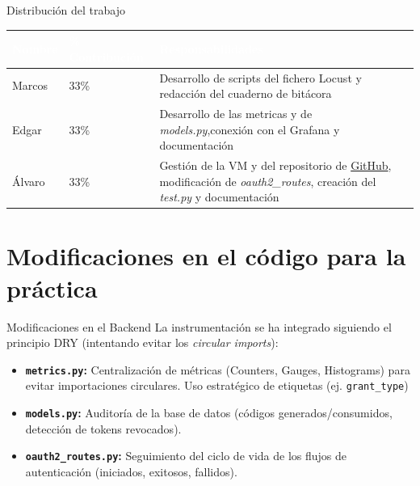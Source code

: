 \documentclass[10pt, aspectratio=169]{beamer}
\begin{document}
	\begin{frame}{Distribución del trabajo}
		\centering
		\renewcommand{\arraystretch}{1.3}
		
		\begin{tabular}{p{3.5cm} p{2.5cm} p{5cm}}
			\toprule
			
			\textcolor{white}{\textbf{Nombre}} & 
			\textcolor{white}{\textbf{\% Contribución}} & 
			\textcolor{white}{\textbf{Responsabilidades}} \\
			
			\midrule
			
			Marcos & 33\% & Desarrollo de scripts del fichero Locust y redacción del cuaderno de bitácora \\
			
			Edgar & 33\% & Desarrollo de las metricas y de \textit{models.py},conexión con el Grafana y documentación \\
			
			Álvaro & 33\% & Gestión de la VM y del repositorio de \hyperlink{https://github.com/ALVPI/ESI/tree/code}{GitHub}, modificación de \textit{oauth2\_routes}, creación del \textit{test.py} y  documentación \\
			
			\bottomrule
		\end{tabular}
		
	\end{frame}
	\section{Modificaciones en el código para la práctica}
	
	\begin{frame}{Modificaciones en el Backend}
		La instrumentación se ha integrado siguiendo el principio DRY (intentando evitar los \textit{circular imports}):
		\vspace{0.3cm}
		\begin{itemize}
			\item \textbf{\texttt{metrics.py}:} Centralización de métricas (Counters, Gauges, Histograms) para evitar importaciones circulares. Uso estratégico de etiquetas (ej. \texttt{grant\_type})
			\item \textbf{\texttt{models.py}:} Auditoría de la base de datos (códigos generados/consumidos, detección de tokens revocados).
			\item \textbf{\texttt{oauth2\_routes.py}:} Seguimiento del ciclo de vida de los flujos de autenticación (iniciados, exitosos, fallidos).
		\end{itemize}
	\end{frame}
	
\end{document}
